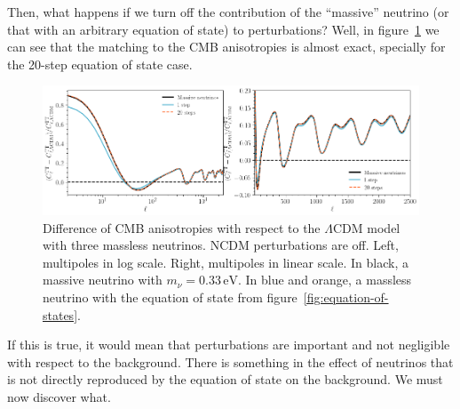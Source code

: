 Then, what happens if we turn off the contribution of the ``massive'' neutrino (or that with an arbitrary equation of state) to perturbations? Well, in figure~\ref{fig:cmb-no-perturbations} we can see that the matching to the CMB anisotropies is almost exact, specially for the 20-step equation of state case. 
\begin{figure}
    \centering
    \includegraphics[width = \textwidth]{"Figures/cmb_330meV_nopert.png"}
    \caption{Difference of CMB anisotropies with respect to the $\Lambda$CDM model with three massless neutrinos. NCDM perturbations are off. Left, multipoles in log scale. Right, multipoles in linear scale. In black, a massive neutrino with $m_\nu = 0.33\, \mathrm{eV}$. In blue and orange, a massless neutrino with the equation of state from figure~\ref{fig:equation-of-states}.}
    \label{fig:cmb-no-perturbations}
\end{figure}

If this is true, it would mean that perturbations are important and not negligible with respect to the background. There is something in the effect of neutrinos that is not directly reproduced by the equation of state on the background. We must now discover what.

